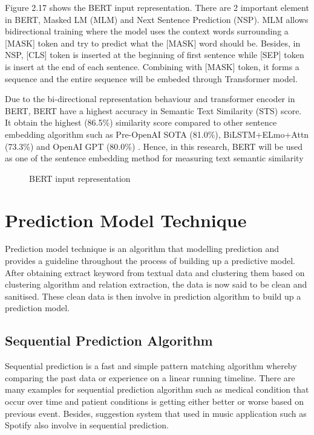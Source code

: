 \documentclass[twoside]{utmthesis}
\begin{document}
\begin{enumerate}
	Figure 2.17 shows the BERT input representation. There are 2 important element in BERT, Masked LM (MLM) and Next Sentence Prediction (NSP). MLM allows bidirectional training where the model uses the context words surrounding a [MASK] token and try to predict what the [MASK] word should be. Besides, in NSP, [CLS] token is inserted at the beginning of first sentence while [SEP] token is insert at the end of each sentence. Combining with [MASK] token, it forms a sequence and the entire sequence will be embeded through Transformer model.
	
	Due to the bi-directional representation behaviour and transformer encoder in BERT, BERT have a highest accuracy in Semantic Text Similarity (STS) score. It obtain the highest (86.5\%) similarity score compared to other sentence embedding algorithm such as Pre-OpenAI SOTA (81.0\%), BiLSTM+ELmo+Attn (73.3\%) and OpenAI GPT (80.0\%) \citep{devlin2018bert}. Hence, in this research, BERT will be used as one of the sentence embedding method for measuring text semantic similarity
	
	\begin{figure}[H]
		\centering
		\caption{BERT input representation \citep{devlin2018bert}}
		\label{fig:bert}
	\end{figure}
	
	
	
\end{enumerate}


\section{Prediction Model Technique}
Prediction model technique is an algorithm that modelling prediction and provides a guideline throughout the process of building up a predictive model. After obtaining extract keyword from textual data and clustering them based on clustering algorithm and relation extraction, the data is now said to be clean and sanitised. These clean data is then involve in prediction algorithm to build up a prediction model.
 
\subsection{Sequential Prediction Algorithm}
Sequential prediction is a fast and simple pattern matching algorithm whereby comparing the past data or experience on a linear running timeline. There are many examples for sequential prediction algorithm such as medical condition that occur over time and patient conditions is getting either better or worse based on previous event. Besides, suggestion system that used in music application such as Spotify also involve in sequential prediction. 
\end{document}

